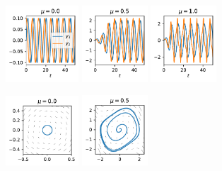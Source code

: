 \documentclass[t]{beamer}
\begin{document}
\begin{frame}
    \begin{figure}[h]
	\centering
	\begin{subfigure}[b]{\textwidth}
	    \centering
	    \includegraphics[width=0.3\textwidth]{../images/vdp_timeplot_mu_00.pdf}
	    \includegraphics[width=0.27\textwidth]{../images/vdp_timeplot_mu_05.pdf}
	    \includegraphics[width=0.27\textwidth]{../images/vdp_timeplot_mu_10.pdf}
	\end{subfigure}
	\begin{subfigure}[b]{\textwidth}
	    \centering
	    \includegraphics[width=0.3\textwidth]{../images/vdp_statespace_mu_00.pdf}
	    \includegraphics[width=0.27\textwidth]{../images/vdp_statespace_mu_05.pdf}

\end{subfigure}
\end{figure}
\end{frame}
\end{document}
